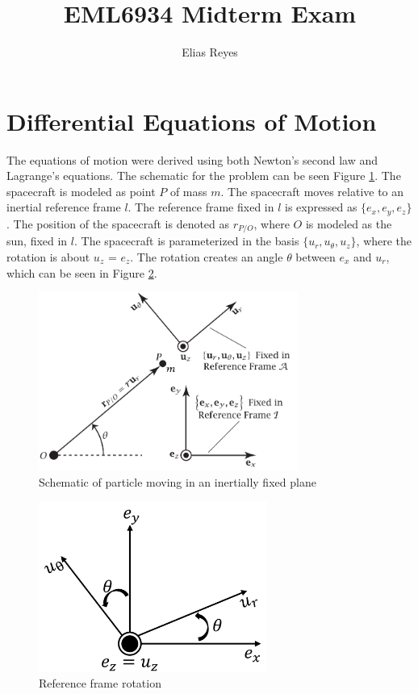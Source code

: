 \documentclass[]{article}
\title{EML6934 Midterm Exam}
\author{Elias Reyes}
\begin{document}
\maketitle

\newpage
\tableofcontents
\newpage
\thispagestyle{empty}
\listoffigures
\listoftables
\newpage
\lstlistoflistings
\newpage

\section{Differential Equations of Motion}
The equations of motion were derived using both Newton's second law and Lagrange's equations. The schematic for the problem can be seen Figure \ref{fig:schematic}. The spacecraft is modeled as point \(P\) of  mass \(m\). The spacecraft moves relative to an inertial reference frame \(l\). The reference frame fixed in \(l\) is expressed as \(\{e_{x},e_{y},e_{z}\}\). The position of the spacecraft is denoted as \(r_{P/O}\), where \(O\) is modeled as the sun, fixed in \(l\). The spacecraft is parameterized in the basis \(\{u_{r},u_{\theta},u_{z}\}\), where the rotation is about \(u_{z}\) = \(e_{z}\). The rotation creates an angle \(\theta\) between \(e_{x}\) and \(u_{r}\), which can be seen in Figure \ref{fig:rotation2}.
\begin{figure}
	\centering
    \includegraphics[width=85mm,scale=0.85]{midterm_schematic.png}
	\caption{Schematic of particle moving in an inertially fixed plane}
	\label{fig:schematic}
\end{figure}
\begin{figure}
	\centering
	\includegraphics[width=75mm,scale=0.75]{rotation.png}
	\caption{Reference frame rotation}
	\label{fig:rotation2}
\end{figure}
\end{document}
